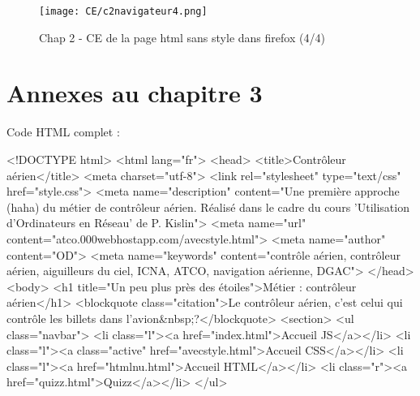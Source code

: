 \documentclass[11pt]{article}
\begin{document}
		\begin{figure}[h]
		\texttt{[image: CE/c2navigateur4.png]}
		\caption{Chap 2 - CE de la page html sans style dans firefox (4/4)}
		\label{c2navigateur4}
		\end{figure}	
		
\section{Annexes au chapitre 3}

Code HTML complet :

\smallskip

\begin{code2}
<!DOCTYPE html>
<html lang="fr">
  	<head>
    	<title>Contrôleur aérien</title>
    	<meta charset="utf-8">
    	<link rel="stylesheet" type="text/css" href="style.css">
    	<meta name="description" content="Une première approche (haha) du métier de contrôleur aérien. Réalisé dans le cadre du cours 'Utilisation d'Ordinateurs en Réseau' de P. Kislin">
    	<meta name="url" content="atco.000webhostapp.com/avecstyle.html">
    	<meta name="author" content="OD">
    	<meta name="keywords" content="contrôle aérien, contrôleur aérien, aiguilleurs du ciel, ICNA, ATCO, navigation aérienne, DGAC">
  	</head>
  	<body>
    	<h1 title="Un peu plus près des étoiles">Métier : contrôleur aérien</h1>
    	<blockquote class="citation">Le contrôleur aérien, c'est celui qui contrôle les billets dans l'avion&nbsp;?</blockquote>
		<section>
			<ul class="navbar">
				<li class="l"><a href="index.html">Accueil JS</a></li>
				<li class="l"><a class="active" href="avecstyle.html">Accueil CSS</a></li>
				<li class="l"><a href="htmlnu.html">Accueil HTML</a></li>
				<li class="r"><a href="quizz.html">Quizz</a></li>
			</ul>\end{code2}
\end{document}
